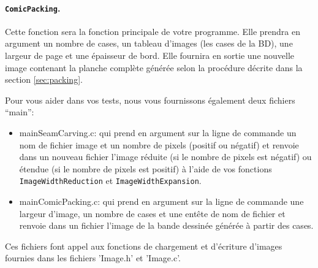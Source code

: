 \documentclass[a4paper,10pt]{article}
\begin{document}
\paragraph{\texttt{ComicPacking}.} Cette fonction sera la fonction principale de votre programme. Elle prendra en argument un nombre de cases, un tableau d'images (les cases de la BD), une largeur de page et une épaisseur de bord. Elle fournira en sortie une nouvelle image contenant la planche complète générée selon la procédure décrite dans la section \ref{sec:packing}.

Pour vous aider dans vos tests, nous vous fournissons également deux
fichiers ``main'':
\begin{itemize}
\item mainSeamCarving.c: qui prend en argument sur la ligne de
  commande un nom de fichier image et un nombre de pixels (positif ou
  négatif) et renvoie dans un nouveau fichier l'image réduite (si le nombre
  de pixels est négatif) ou étendue (si le nombre de pixels est
  positif) à l'aide de vos fonctions \texttt{ImageWidthReduction} et
  \texttt{ImageWidthExpansion}.
\item mainComicPacking.c: qui prend en argument sur la ligne de
  commande une largeur d'image, un nombre de cases et une entête de
  nom de fichier et renvoie dans un fichier l'image de la bande
  dessinée générée à partir des cases.
\end{itemize}
Ces fichiers font appel aux fonctions de chargement et d'écriture d'images fournies dans les fichiers 'Image.h' et 'Image.c'.


\end{document}
